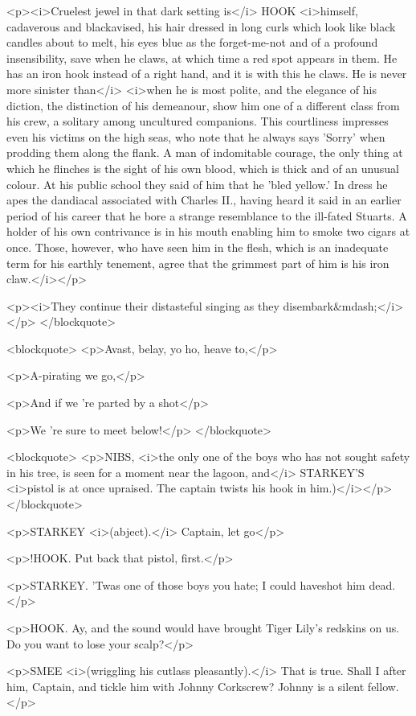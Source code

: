 <p><i>Cruelest jewel in that dark setting is</i> HOOK <i>himself,
cadaverous and blackavised, his hair dressed in long curls which look
like black candles about to melt, his eyes blue as the forget-me-not
and of a profound insensibility, save when he claws, at which time a
red spot appears in them. He has an iron hook instead of a right
hand, and it is with this he claws. He is never more sinister
than</i> <i>when he is most polite, and the elegance of his diction,
the distinction of his demeanour, show him one of a different class
from his crew, a solitary among uncultured companions. This
courtliness impresses even his victims on the high seas, who note
that he always says 'Sorry' when prodding them along the flank. A man
of indomitable courage, the only thing at which he flinches is the
sight of his own blood, which is thick and of an unusual colour. At
his public school they said of him that he 'bled yellow.' In dress he
apes the dandiacal associated with Charles II., having heard it said
in an earlier period of his career that he bore a strange resemblance
to the ill-fated Stuarts. A holder of his own contrivance is in his
mouth enabling him to smoke two cigars at once. Those, however, who
have seen him in the flesh, which is an inadequate term for his
earthly tenement, agree that the grimmest part of him is his iron
claw.</i></p>

<p><i>They continue their distasteful singing as they
disembark&mdash;</i></p>
</blockquote>

<blockquote>
<p>Avast, belay, yo ho, heave to,</p>

<p>A-pirating we go,</p>

<p>And if we 're parted by a shot</p>

<p>We 're sure to meet below!</p>
</blockquote>

<blockquote>
<p>NIBS, <i>the only one of the boys who has not sought safety in his
tree, is seen for a moment near the lagoon, and</i> STARKEY'S
<i>pistol is at once upraised. The captain twists his hook in
him.)</i></p>
</blockquote>

<p>STARKEY <i>(abject).</i> Captain, let go</p>

<p>!HOOK. Put back that pistol, first.</p>

<p>STARKEY. 'Twas one of those boys you hate; I could haveshot him
dead.</p>

<p>HOOK. Ay, and the sound would have brought Tiger Lily's redskins
on us. Do you want to lose your scalp?</p>

<p>SMEE <i>(wriggling his cutlass pleasantly).</i> That is true.
Shall I after him, Captain, and tickle him with Johnny Corkscrew?
Johnny is a silent fellow.</p>

